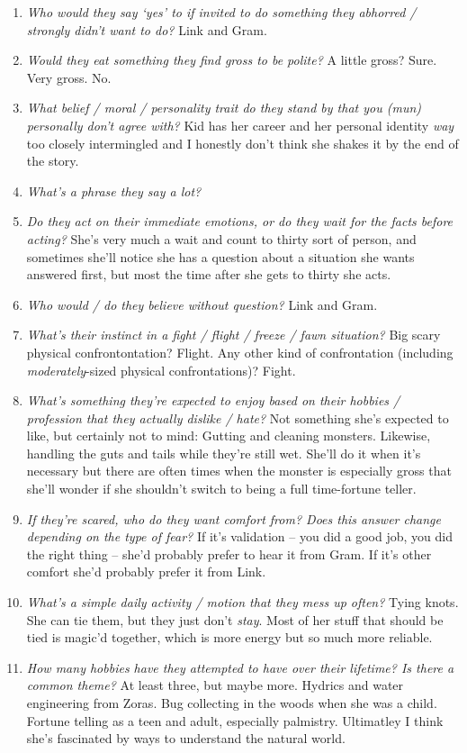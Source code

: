 \begin{enumerate}
    \item \textit{Who would they say ‘yes’ to if invited to do something they abhorred / strongly didn’t want to do?}
      Link and Gram. 
    \item \textit{Would they eat something they find gross to be polite?}
      A little gross? Sure. Very gross. No.
    \item \textit{What belief / moral / personality trait do they stand by that you (mun) personally don’t agree with?}
      Kid has her career and her personal identity \emph{way} too closely intermingled and I honestly don't think she shakes it by the end of the story.
    \item \textit{What’s a phrase they say a lot?}
      
    \item \textit{Do they act on their immediate emotions, or do they wait for the facts before acting?}
      She's very much a wait and count to thirty sort of person, and sometimes she'll notice she has a question about a situation she wants answered first, but most the time after she gets to thirty she acts.
    \item \textit{Who would / do they believe without question?}
      Link and Gram.
    \item \textit{What’s their instinct in a fight / flight / freeze / fawn situation?}
      Big scary physical confrontontation? Flight. Any other kind of confrontation (including \emph{moderately}-sized physical confrontations)? Fight.
    \item \textit{What’s something they’re expected to enjoy based on their hobbies / profession that they actually dislike / hate?}\label{irene:characterq:workhates} 
      Not something she's expected to like, but certainly not to mind: Gutting and cleaning monsters. Likewise, handling the guts and tails while they're still wet. She'll do it when it's necessary but there are often times when the monster is especially gross that she'll wonder if she shouldn't switch to being a full time-fortune teller.
    \item \textit{If they’re scared, who do they want comfort from? Does this answer change depending on the type of fear?}
      If it's validation -- you did a good job, you did the right thing -- she'd probably prefer to hear it from Gram. If it's other comfort she'd probably prefer it from Link.
    \item \textit{What’s a simple daily activity / motion that they mess up often?}
      Tying knots. She can tie them, but they just don't \emph{stay}. Most of her stuff that should be tied is magic'd together, which is more energy but so much more reliable.    
    \item \textit{How many hobbies have they attempted to have over their lifetime? Is there a common theme?}
      At least three, but maybe more. Hydrics and water engineering from Zoras. Bug collecting in the woods when she was a child. Fortune telling as a teen and adult, especially palmistry. Ultimatley I think she's fascinated by ways to understand the natural world.
  \end{enumerate}